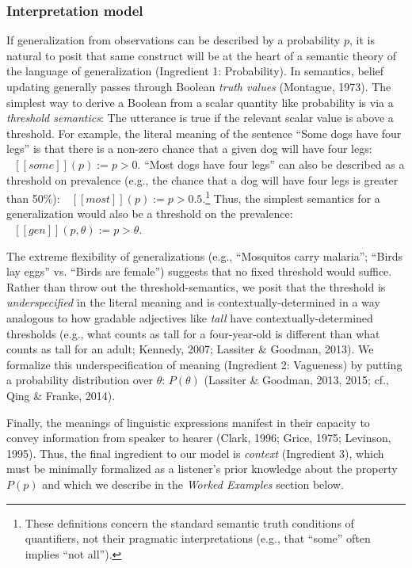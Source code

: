 \documentclass[english,,man,floatsintext]{apa6}
\let\rmarkdownfootnote\footnote%
\def\footnote{\protect\rmarkdownfootnote}
\theoremstyle{definition}
\theoremstyle{definition}
\theoremstyle{definition}
\theoremstyle{remark}
\begin{document}
\hypertarget{interpretation-model}{%
\subsubsection{Interpretation model}\label{interpretation-model}}

If generalization from observations can be described by a probability
\(p\), it is natural to posit that same construct will be at the heart
of a semantic theory of the language of generalization (Ingredient 1:
Probability). In semantics, belief updating generally passes through
Boolean \emph{truth values} (Montague, 1973). The simplest way to derive
a Boolean from a scalar quantity like probability is via a
\emph{threshold semantics}: The utterance is true if the relevant scalar
value is above a threshold. For example, the literal meaning of the
sentence \enquote{Some dogs have four legs} is that there is a non-zero
chance that a given dog will have four legs:
\(\mbox{ $[\![ some ]\!]$}(p) := p > 0\). \enquote{Most dogs have four
legs} can also be described as a threshold on prevalence (e.g., the
chance that a dog will have four legs is greater than 50\%):
\(\mbox{ $[\![ most ]\!]$}(p) := p > 0.5\).\footnote{These definitions
  concern the standard semantic truth conditions of quantifiers, not
  their pragmatic interpretations (e.g., that \enquote{some} often
  implies \enquote{not all}).} Thus, the simplest semantics for a
generalization would also be a threshold on the prevalence:
\(\mbox{ $[\![ gen ]\!]$}(p, \theta) := p >\theta\).

The extreme flexibility of generalizations (e.g., \enquote{Mosquitos
carry malaria}; \enquote{Birds lay eggs} vs. \enquote{Birds are female})
suggests that no fixed threshold would suffice. Rather than throw out
the threshold-semantics, we posit that the threshold is
\emph{underspecified} in the literal meaning and is
contextually-determined in a way analogous to how gradable adjectives
like \emph{tall} have contextually-determined thresholds (e.g., what
counts as tall for a four-year-old is different than what counts as tall
for an adult; Kennedy, 2007; Lassiter \& Goodman, 2013). We formalize
this underspecification of meaning (Ingredient 2: Vagueness) by putting
a probability distribution over \(\theta\): \(P(\theta)\) (Lassiter \&
Goodman, 2013, 2015; cf., Qing \& Franke, 2014).

Finally, the meanings of linguistic expressions manifest in their
capacity to convey information from speaker to hearer (Clark, 1996;
Grice, 1975; Levinson, 1995). Thus, the final ingredient to our model is
\emph{context} (Ingredient 3), which must be minimally formalized as a
listener's prior knowledge about the property \(P(p)\) and which we
describe in the \emph{Worked Examples} section below.
\end{document}
